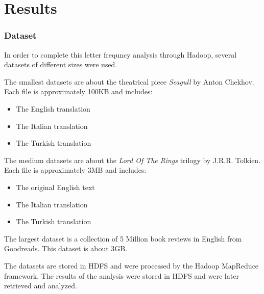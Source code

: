 \chapter{Results}

\subsection{Dataset}
In order to complete this letter frequncy analysis through Hadoop, several datasets of different sizes were used. 

The smallest datasets are about the theatrical piece \textit{Seagull} by Anton Chekhov. Each file is approximately 100KB and includes: 
\begin{itemize}
    \item The English translation
    \item The Italian translation
    \item The Turkish translation
\end{itemize}

The medium datasets are about the \textit{Lord Of The Rings} trilogy by J.R.R. Tolkien. Each file is approximately 3MB and includes: 
\begin{itemize}
    \item The original English text
    \item The Italian translation
    \item The Turkish translation
\end{itemize}

The largest dataset is a collection of 5 Million book reviews in English from Goodreads. This dataset is about 3GB. 
 
The datasets are stored in HDFS and were processed by the Hadoop MapReduce framework. The results of the analysis were stored in HDFS and were later retrieved and analyzed.
\newpage
